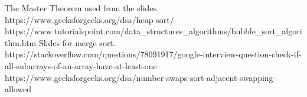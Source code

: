 \documentclass{article}[12pt]
\begin{document}







\begin{thebibliography}{99}
 The Master Theorem used from the slides.
 https://www.geeksforgeeks.org/dsa/heap-sort/
 https://www.tutorialspoint.com/data\_structures\_algorithms/bubble\_sort\_algorithm.htm
 Slides for merge sort.
 https://stackoverflow.com/questions/78091917/google-interview-question-check-if-all-subarrays-of-an-array-have-at-least-one
 https://www.geeksforgeeks.org/dsa/number-swaps-sort-adjacent-swapping-allowed

\end{thebibliography}
\end{document}
